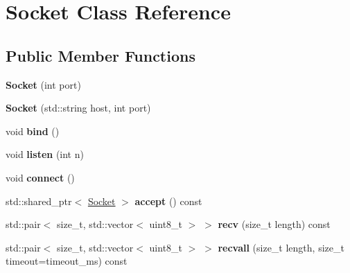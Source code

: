 \hypertarget{classSocket}{}\section{Socket Class Reference}
\label{classSocket}
\subsection*{Public Member Functions}
\begin{DoxyCompactItemize}
\item 
{\bfseries Socket} (int port)\hypertarget{classSocket_a1c4718d5b4b33f92559ba413ad119c03}{}\label{classSocket_a1c4718d5b4b33f92559ba413ad119c03}

\item 
{\bfseries Socket} (std\+::string host, int port)\hypertarget{classSocket_a6f2a05cfd7ed519d6996bd93fc97b1d8}{}\label{classSocket_a6f2a05cfd7ed519d6996bd93fc97b1d8}

\item 
void {\bfseries bind} ()\hypertarget{classSocket_ace1da4f860ac0af46d702cb5fc875a51}{}\label{classSocket_ace1da4f860ac0af46d702cb5fc875a51}

\item 
void {\bfseries listen} (int n)\hypertarget{classSocket_a013eb69c37d618d6eda7ed1b56d855fb}{}\label{classSocket_a013eb69c37d618d6eda7ed1b56d855fb}

\item 
void {\bfseries connect} ()\hypertarget{classSocket_a6b6e12fe65a4a47426e4dcfee7a37461}{}\label{classSocket_a6b6e12fe65a4a47426e4dcfee7a37461}

\item 
std\+::shared\+\_\+ptr$<$ \hyperlink{classSocket}{Socket} $>$ {\bfseries accept} () const \hypertarget{classSocket_af2f293542ac8118caf8d1b080e5fc536}{}\label{classSocket_af2f293542ac8118caf8d1b080e5fc536}

\item 
std\+::pair$<$ size\+\_\+t, std\+::vector$<$ uint8\+\_\+t $>$ $>$ {\bfseries recv} (size\+\_\+t length) const \hypertarget{classSocket_a26b9b140ccf151ca483f35e1751ca6b9}{}\label{classSocket_a26b9b140ccf151ca483f35e1751ca6b9}

\item 
std\+::pair$<$ size\+\_\+t, std\+::vector$<$ uint8\+\_\+t $>$ $>$ {\bfseries recvall} (size\+\_\+t length, size\+\_\+t timeout=timeout\+\_\+ms) const \hypertarget{classSocket_a771a254112e93ad650a5215f31d0ed07}{}\label{classSocket_a771a254112e93ad650a5215f31d0ed07}


\end{DoxyCompactItemize}
